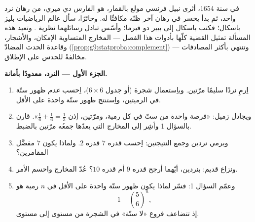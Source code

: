 \begin{problem}
\label{pb:g9:statproba:1}
في سنة 1654، أثرى نبيل فرنسي مولع بالقمار، هو الفارس دي ميري،
من رهان نرد واحد، ثم بدأ يخسر في رهان آخر ظنّه مكافئًا له.
وحائرًا، سأل عالم الرياضيات بليز باسكال؛ فكتب باسكال إلى بيير دو
فيرما؛ وأسّس تبادل رسائلهما نظرية . وتعيد هذه المسألة
تمثيل القضية كلّها بأدوات هذا الفصل --- المخارج المتساوية
الإمكان، والأشجار، وقاعدة الحدث المضادّ
(\cref{prop:g9:statproba:complement}) --- وتنتهي بأكثر المصادفات
مخالفةً للحدس على الإطلاق.

\medskip
\noindent\textbf{الجزء الأول --- النرد، معدودًا بأمانة.}
\begin{enumerate}
  \item اِرمِ نردًا سليمًا مرّتين. وباِستعمال شجرة (أو جدول
        $6 \times 6$)، اِحسب  \emph{عدم} ظهور ستّة في
        الرميتين، واِستنتج  ظهور ستّة واحدة على الأقل.
  \item ويجادل زميل: «فرصة واحدة من ستّ في كل رمية، ومرّتين،
        إذن $\frac16 + \frac16 = \frac13$». قارن بالسؤال 1
        وأشِر إلى المخارج التي يعدّها جمعُه مرّتين بالضبط.
  \item وبرمي نردين وجمع النتيجتين: اِحسب  
        قدره $7$  قدره $2$. ولماذا يكون $7$ مفضَّل
        المقامرين؟
  \item ونزاع قديم: بنردين، أيّهما أرجح  قدره $9$ أم
         قدره $10$؟ عُدّ المخارج واحسم الأمر.
  \item وعمّم السؤال 1: فسّر لماذا يكون  ظهور ستّة
        واحدة على الأقل في $n$ رمية هو
        \[
        1 - \left(\frac56\right)^{\!n} ,
        \]
        إذ تتضاعف فروع «لا ستّة» في الشجرة من مستوى إلى مستوى.
\end{enumerate}


\end{problem}

